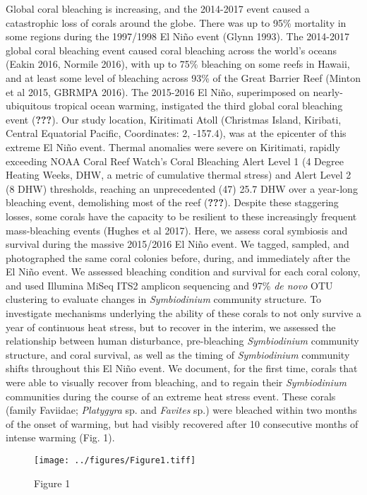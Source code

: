 \documentclass[]{article}
\begin{document}
Global coral bleaching is increasing, and the 2014-2017 event caused a
catastrophic loss of corals around the globe. There was up to 95\%
mortality in some regions during the 1997/1998 El Niño event (Glynn
1993). The 2014-2017 global coral bleaching event caused coral bleaching
across the world's oceans (Eakin 2016, Normile 2016), with up to 75\%
bleaching on some reefs in Hawaii, and at least some level of bleaching
across 93\% of the Great Barrier Reef (Minton et al 2015, GBRMPA 2016).
The 2015-2016 El Niño, superimposed on nearly-ubiquitous tropical ocean
warming, instigated the third global coral bleaching event
(\textbf{???}). Our study location, Kiritimati Atoll (Christmas Island,
Kiribati, Central Equatorial Pacific, Coordinates: 2, -157.4), was at
the epicenter of this extreme El Niño event. Thermal anomalies were
severe on Kiritimati, rapidly exceeding NOAA Coral Reef Watch's Coral
Bleaching Alert Level 1 (4 Degree Heating Weeks, DHW, a metric of
cumulative thermal stress) and Alert Level 2 (8 DHW) thresholds,
reaching an unprecedented (47) 25.7 DHW over a year-long bleaching
event, demolishing most of the reef (\textbf{???}). Despite these
staggering losses, some corals have the capacity to be resilient to
these increasingly frequent mass-bleaching events (Hughes et al 2017).
Here, we assess coral symbiosis and survival during the massive
2015/2016 El Niño event. We tagged, sampled, and photographed the same
coral colonies before, during, and immediately after the El Niño event.
We assessed bleaching condition and survival for each coral colony, and
used Illumina MiSeq ITS2 amplicon sequencing and 97\% \emph{de novo} OTU
clustering to evaluate changes in \emph{Symbiodinium} community
structure. To investigate mechanisms underlying the ability of these
corals to not only survive a year of continuous heat stress, but to
recover in the interim, we assessed the relationship between human
disturbance, pre-bleaching \emph{Symbiodinium} community structure, and
coral survival, as well as the timing of \emph{Symbiodinium} community
shifts throughout this El Niño event. We document, for the first time,
corals that were able to visually recover from bleaching, and to regain
their \emph{Symbiodinium} communities during the course of an extreme
heat stress event. These corals (family Faviidae; \emph{Platygyra} sp.
and \emph{Favites} sp.) were bleached within two months of the onset of
warming, but had visibly recovered after 10 consecutive months of
intense warming (Fig. 1).

\begin{figure}
\centering
\texttt{[image: ../figures/Figure1.tiff]}
\caption{Figure 1}
\end{figure}
\end{document}
